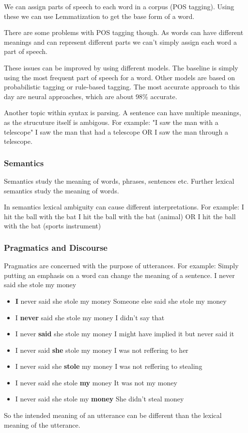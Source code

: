 \documentclass[
../../NLP4W_Summary.tex,
]
{subfiles}
\begin{document}
We can assign parts of speech to each word in a corpus (POS tagging). Using these we can use Lemmatization to get the base form of a word.

There are some problems with POS tagging though. As words can have different meanings and can represent different parts we can't simply assign each word a part of speech.

These issues can be improved by using different models. The baseline is simply using the most frequent part of speech for a word. Other models are based on probabilistic tagging or rule-based tagging. 
The most accurate approach to this day are neural approaches, which are about 98\% accurate.

Another topic within syntax is parsing. A sentence can have multiple meanings, as the strucuture itself is ambigous. For example: "I saw the man with a telescope" \rightarrow I saw the man that had a telescope OR I saw the man through a telescope.

\subsubsection{Semantics}
Semantics study the meaning of words, phrases, sentences etc.
Further lexical semantics study the meaning of words. 

In semantics lexical ambiguity can cause different interpretations. For example: I hit the ball with the bat \rightarrow I hit the ball with the bat (animal) OR I hit the ball with the bat (sports instrument)

\subsubsection{Pragmatics and Discourse}

Pragmatics are concerned with the purpose of utterances. For example: Simply putting an emphasis on a word can change the meaning of a sentence. I never said she stole my money 
\begin{itemize}
    \item \textbf{I} never said she stole my money \rightarrow Someone else said she stole my money
    \item I \textbf{never} said she stole my money \rightarrow I didn't say that
    \item I never \textbf{said} she stole my money \rightarrow I might have implied it but never said it
    \item I never said \textbf{she} stole my money \rightarrow I was not reffering to her
    \item I never said she \textbf{stole} my money \rightarrow I was not reffering to stealing
    \item I never said she stole \textbf{my} money \rightarrow It was not my money
    \item I never said she stole my \textbf{money} \rightarrow She didn't steal money
\end{itemize}

So the intended meaning of an utterance can be different than the lexical meaning of the utterance.
\end{document}
